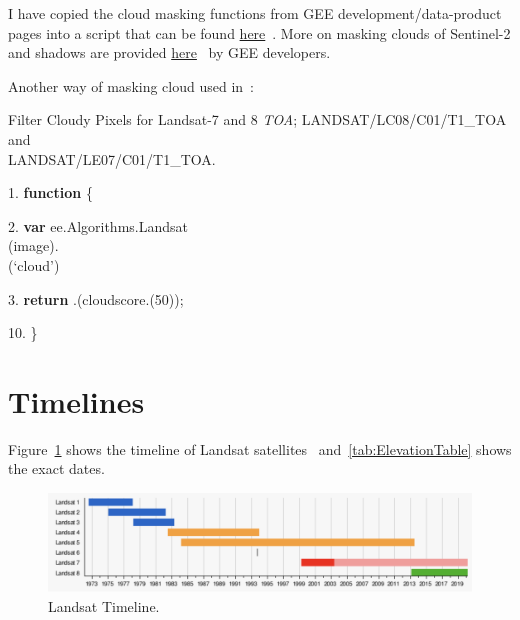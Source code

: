 I have copied the cloud masking functions
from GEE development/data-product pages into a script that can be found 
\href{https://code.earthengine.google.com/?scriptPath=users\%2Fhnoorazar\%2FGEE_Mini_Tutorial\%3ACloudMaskings}{here}~\citep{CloudandMaskingFunctionsonMyGEE}.
More on masking clouds of Sentinel-2 and shadows
are provided \href{https://developers.google.com/earth-engine/tutorials/community/sentinel-2-s2cloudless}{here}~\citep{CloudandShadowSentinel} by GEE developers.


Another way of masking cloud used in~\citep{rs11070820}:

\begin{tcolorbox}
  \begin{algorithm}[H]
  \label{alg:FilterCloudyPixelsLandsat78TOA}
   \caption{Filter Cloudy Pixels for Landsat-7 and 8 \emph{TOA};
   LANDSAT/LC08/C01/T1\_TOA and\\
   LANDSAT/LE07/C01/T1\_TOA.}
\SetAlgoLined

1. \textbf{function} 
 \{

\vspace{.1in}
\hspace{.2in} 2. 
\textbf{var}  ee.Algorithms.Landsat\\\hspace{1.6in} (image).\\ 
\hspace{1.6in}  (`cloud')\;

\vspace{.1in}

\hspace{.2in} 3.
\small{\textbf{return} .(cloudscore.(50));}
  
\hspace{.01in} 10. \}
\end{algorithm}
\end{tcolorbox}


\section{Timelines}
\label{sec:Timelines}
Figure~\ref{fig:landsatTimeline}
shows the timeline of Landsat
satellites~\citep{LandsatTimelinesWiki}
and~\cref{tab:ElevationTable} shows the
exact dates.
\begin{figure}[htb]
  \includegraphics[width=1\textwidth]{figures/landsatTimeline1}
\caption{Landsat Timeline.}
\label{fig:landsatTimeline}
\end{figure}

